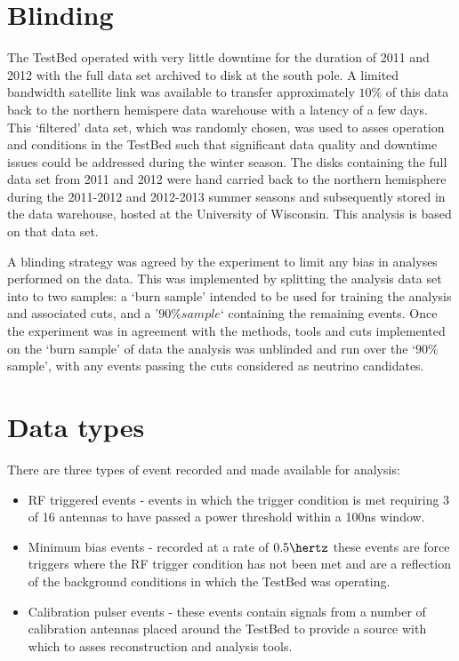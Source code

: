 \section{Blinding}
\label{sec:Analysis:Blinding}
The TestBed operated with very little downtime for the duration of 2011 and 2012 with the full data set archived to disk at the south pole. A limited bandwidth satellite link was available to transfer approximately $10 \%$ of this data back to the northern hemispere data warehouse with a latency of a few days. This `filtered' data set, which was randomly chosen, was used to asses operation and conditions in the TestBed such that significant data quality and downtime issues could be addressed during the winter season. The disks containing the full data set from 2011 and 2012 were hand carried back to the northern hemisphere during the 2011-2012 and 2012-2013 summer seasons and subsequently stored in the data warehouse, hosted at the University of Wisconsin. This analysis is based on that data set.

A blinding strategy was agreed by the experiment to limit any bias in analyses performed on the data. This was implemented by splitting the analysis data set into to two samples: a `burn sample' intended to be used for training the analysis and associated cuts, and a '$90 \% sample$` containing the remaining events. Once the experiment was in agreement with the methods, tools and cuts implemented on the `burn sample' of data the analysis was unblinded and run over the `$90 \%$ sample', with any events passing the cuts considered as neutrino candidates.

\section{Data types}
\label{sec:Analysis:Data-types}

There are three types of event recorded and made available for analysis:

\begin{itemize}

\item RF triggered events - events in which the trigger condition is met requiring 3 of 16 antennas to have passed a power threshold within a 100ns window.
\item Minimum bias events - recorded at a rate of $0.5 \hertz$ these events are force triggers where the RF trigger condition has not been met and are a reflection of the background conditions in which the TestBed was operating.
\item Calibration pulser events - these events contain signals from a number of calibration antennas placed around the TestBed to provide a source with which to asses reconstruction and analysis tools.

\end{itemize}

